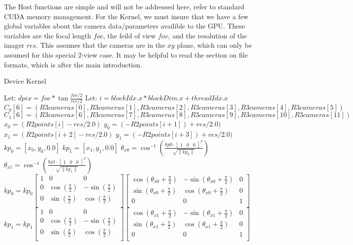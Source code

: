 
The Host functions are simple and will not be addressed here, refer to standard CUDA memory management.
For the Kernel, we must insure that we have a few global variables about the camera data/parameters
availible to the GPU. These variables are the focal length $foc$, the feild of view $fov$, and the
resolution of the imager $res$. This assumes that the cameras are in the $xy$ plane, which can only
be assumed for this special 2-view case. It may be helpful to read the section on file formats, which
is after the main introduction.

\begin{algorithm}
\caption{Device Kernel}\label{Line Generation Device}
\begin{algorithmic}[1]
  \State Let: $dpix = foc * \tan{\frac{fov/2}{res/2}}$
  \State Let: $i = blockIdx.x * blockDim.x + threadIdx.x$
    \State $C_0[6] = (R3cameras[0],R3cameras[1],R3cameras[2],R3cameras[3],R3cameras[4],R3cameras[5])$
    \State $C_1[6] = (R3cameras[6],R3cameras[7],R3cameras[8],R3cameras[9],R3cameras[10],R3cameras[11])$
    \State $x_0 = (R2points[i] - res/2.0)$
    \State $y_0 = (-R2points[i+1]) + res/2.0)$
    \State $x_1 = (R2points[i+2] - res/2.0)$
    \State $y_1 = (-R2points[i+3]) + res/2.0)$
    \State $kp_0 = [x_0,y_0,0.0]$
    \State $kp_1 = [x_1,y_1,0.0]$
    \State $\theta_{x0} = \cos^{-1}(\frac{kp0 \cdot \begin{bmatrix}1 & 0 & 0\end{bmatrix}^{T}}{\sqrt{\|kp_0\|}})$
    \State $\theta_{x1} = \cos^{-1}(\frac{kp1 \cdot \begin{bmatrix}1 & 0 & 0\end{bmatrix}^{T}}{\sqrt{\|kp_1\|}})$
    \State $kp_0 = kp_0 \begin{bmatrix}1 & 0 & 0\\ 0 & \cos(\frac{\pi}{2}) & -\sin(\frac{\pi}{2})\\ 0 & \sin(\frac{\pi}{2}) & \cos(\frac{\pi}{2})\\ \end{bmatrix}    \begin{bmatrix}\cos(\theta_{x0} + \frac{\pi}{2}) & -\sin(\theta_{x0} + \frac{\pi}{2}) & 0\\ \sin(\theta_{x0} + \frac{\pi}{2}) & \cos(\theta_{x0} + \frac{\pi}{2}) & 0\\ 0 & 0 & 1\\ \end{bmatrix}$
    \State $kp_1 = kp_1 \begin{bmatrix}1 & 0 & 0\\ 0 & \cos(\frac{\pi}{2}) & -\sin(\frac{\pi}{2})\\ 0 & \sin(\frac{\pi}{2}) & \cos(\frac{\pi}{2})\\ \end{bmatrix}    \begin{bmatrix}\cos(\theta_{x1} + \frac{\pi}{2}) & -\sin(\theta_{x1} + \frac{\pi}{2}) & 0\\ \sin(\theta_{x1} + \frac{\pi}{2}) & \cos(\theta_{x1} + \frac{\pi}{2}) & 0\\ 0 & 0 & 1\\ \end{bmatrix}$

\end{algorithmic}
\end{algorithm}
